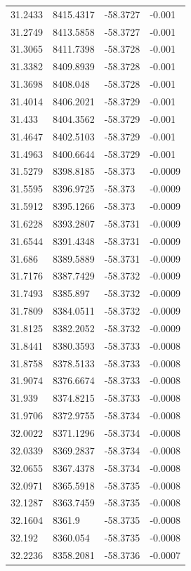 \begin{table}[H]
\begin{tabular}{llll}
31.2433 & 8415.4317 & -58.3727 & -0.001 \\
31.2749 & 8413.5858 & -58.3727 & -0.001 \\
31.3065 & 8411.7398 & -58.3728 & -0.001 \\
31.3382 & 8409.8939 & -58.3728 & -0.001 \\
31.3698 & 8408.048 & -58.3728 & -0.001 \\
31.4014 & 8406.2021 & -58.3729 & -0.001 \\
31.433 & 8404.3562 & -58.3729 & -0.001 \\
31.4647 & 8402.5103 & -58.3729 & -0.001 \\
31.4963 & 8400.6644 & -58.3729 & -0.001 \\
31.5279 & 8398.8185 & -58.373 & -0.0009 \\
31.5595 & 8396.9725 & -58.373 & -0.0009 \\
31.5912 & 8395.1266 & -58.373 & -0.0009 \\
31.6228 & 8393.2807 & -58.3731 & -0.0009 \\
31.6544 & 8391.4348 & -58.3731 & -0.0009 \\
31.686 & 8389.5889 & -58.3731 & -0.0009 \\
31.7176 & 8387.7429 & -58.3732 & -0.0009 \\
31.7493 & 8385.897 & -58.3732 & -0.0009 \\
31.7809 & 8384.0511 & -58.3732 & -0.0009 \\
31.8125 & 8382.2052 & -58.3732 & -0.0009 \\
31.8441 & 8380.3593 & -58.3733 & -0.0008 \\
31.8758 & 8378.5133 & -58.3733 & -0.0008 \\
31.9074 & 8376.6674 & -58.3733 & -0.0008 \\
31.939 & 8374.8215 & -58.3733 & -0.0008 \\
31.9706 & 8372.9755 & -58.3734 & -0.0008 \\
32.0022 & 8371.1296 & -58.3734 & -0.0008 \\
32.0339 & 8369.2837 & -58.3734 & -0.0008 \\
32.0655 & 8367.4378 & -58.3734 & -0.0008 \\
32.0971 & 8365.5918 & -58.3735 & -0.0008 \\
32.1287 & 8363.7459 & -58.3735 & -0.0008 \\
32.1604 & 8361.9 & -58.3735 & -0.0008 \\
32.192 & 8360.054 & -58.3735 & -0.0008 \\
32.2236 & 8358.2081 & -58.3736 & -0.0007 \\

\end{tabular}
\end{table}
